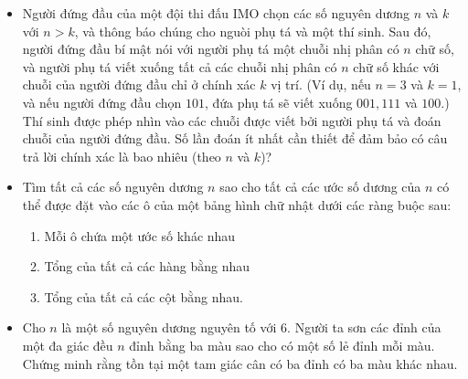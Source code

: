 \documentclass[11pt]{scrartcl}
\begin{document}
\begin{itemize}[label=, leftmargin=0em, itemsep=-0em]
    \item \begin{btvn}
        Người đứng đầu của một đội thi đấu IMO chọn các số nguyên dương $n$ và $k$ với $n > k$, và thông báo chúng cho nguòi phụ tá và một thí sinh. Sau đó, người đứng đầu bí mật nói với người phụ tá một chuỗi nhị phân có $n$ chữ số, và người phụ tá viết xuống tất cả các chuỗi nhị phân có $n$ chữ số khác với chuỗi của người đứng đầu chỉ ở chính xác $k$ vị trí. (Ví dụ, nếu $n = 3$ và $k = 1$, và nếu người đứng đầu chọn $101$, đứa phụ tá sẽ viết xuống $001, 111$ và $100$.) Thí sinh được phép nhìn vào các chuỗi được viết bởi người phụ tá và đoán chuỗi của người đứng đầu. Số lần đoán ít nhất cần thiết để đảm bảo có câu trả lời chính xác là bao nhiêu (theo $n$ và $k$)?
    \end{btvn}
    \item \begin{btvn}    
        Tìm tất cả các số nguyên dương $n$ sao cho tất cả các ước số dương của $n$ có thể được đặt vào các ô của một bảng hình chữ nhật dưới các ràng buộc sau:
        \begin{enumerate}
            \item Mỗi ô chứa một ước số khác nhau
            \item Tổng của tất cả các hàng bằng nhau
            \item Tổng của tất cả các cột bằng nhau.
        \end{enumerate}
            \end{btvn}
    \item\begin{btvn}
        Cho $n$ là một số nguyên dương nguyên tố với $6$. Người ta sơn các đỉnh của một đa giác đều $n$ đỉnh bằng ba màu sao cho có một số lẻ đỉnh mỗi màu. Chứng minh rằng tồn tại một tam giác cân có ba đỉnh có ba màu khác nhau.
    \end{btvn}


\end{itemize}
\end{document}
